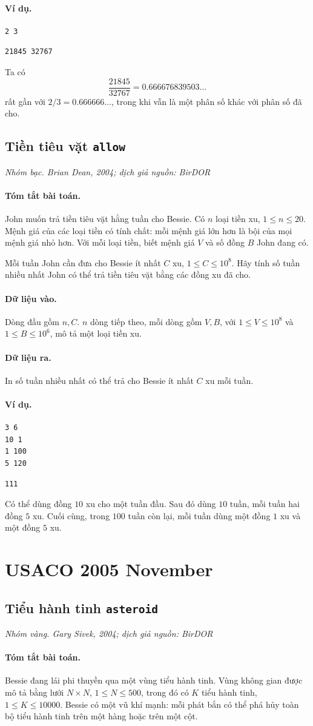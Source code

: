 \documentclass[11pt]{article}
\newcommand{\problem}[4]{%
  \subsection[#1 (#2)]{#1 \hfill {\normalsize\texttt{#2}}}%
  \noindent\textit{#3. #4}\par\smallskip
}
\newcommand{\iosec}[1]{\paragraph{#1}}
\begin{document}
\iosec{Ví dụ.}
\begin{verbatim}
2 3
\end{verbatim}

\begin{verbatim}
21845 32767
\end{verbatim}

Ta có
\[
  \frac{21845}{32767}=0.666676839503\ldots
\]
rất gần với \(2/3=0.666666\ldots\), trong khi vẫn là một phân số khác với
phân số đã cho.

\problem{Tiền tiêu vặt}{allow}{Nhóm bạc}{Brian Dean, 2004; dịch giả nguồn: BirDOR}

\iosec{Tóm tắt bài toán.}
John muốn trả tiền tiêu vặt hằng tuần cho Bessie. Có \(n\) loại tiền xu,
\(1\le n\le 20\). Mệnh giá của các loại tiền có tính chất: mỗi mệnh giá lớn
hơn là bội của mọi mệnh giá nhỏ hơn. Với mỗi loại tiền, biết mệnh giá \(V\)
và số đồng \(B\) John đang có.

Mỗi tuần John cần đưa cho Bessie ít nhất \(C\) xu, \(1\le C\le 10^8\). Hãy
tính số tuần nhiều nhất John có thể trả tiền tiêu vặt bằng các đồng xu đã
cho.

\iosec{Dữ liệu vào.}
Dòng đầu gồm \(n,C\). \(n\) dòng tiếp theo, mỗi dòng gồm \(V,B\), với
\(1\le V\le 10^8\) và \(1\le B\le 10^6\), mô tả một loại tiền xu.

\iosec{Dữ liệu ra.}
In số tuần nhiều nhất có thể trả cho Bessie ít nhất \(C\) xu mỗi tuần.

\iosec{Ví dụ.}
\begin{verbatim}
3 6
10 1
1 100
5 120
\end{verbatim}

\begin{verbatim}
111
\end{verbatim}

Có thể dùng đồng \(10\) xu cho một tuần đầu. Sau đó dùng \(10\) tuần, mỗi tuần
hai đồng \(5\) xu. Cuối cùng, trong \(100\) tuần còn lại, mỗi tuần dùng một
đồng \(1\) xu và một đồng \(5\) xu.

\section{USACO 2005 November}

\problem{Tiểu hành tinh}{asteroid}{Nhóm vàng}{Gary Sivek, 2004; dịch giả nguồn: BirDOR}

\iosec{Tóm tắt bài toán.}
Bessie đang lái phi thuyền qua một vùng tiểu hành tinh. Vùng không gian được
mô tả bằng lưới \(N\times N\), \(1\le N\le 500\), trong đó có \(K\) tiểu hành
tinh, \(1\le K\le 10000\). Bessie có một vũ khí mạnh: mỗi phát bắn có thể phá
hủy toàn bộ tiểu hành tinh trên một hàng hoặc trên một cột.
\end{document}
